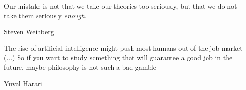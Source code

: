 \documentclass[./main_en.tex]{subfiles}
\begin{document}
\newpage
\renewcommand{\headrulewidth}{0pt}
\thispagestyle{fancy}
\fancyhf{} %
\fancyfoot{} %
\fancyfoot[C]{\thepage}

\epigraph{Our mistake is not that we take our theories too seriously, but that we do not take them seriously \textit{enough}.}{Steven Weinberg}

\epigraph{The rise of artificial intelligence might push most humans out
of the job market (...) So if you want to study something that will guarantee a good job in the future, maybe philosophy is not such a bad gamble}{Yuval Harari}


\clearpage
\end{document}
